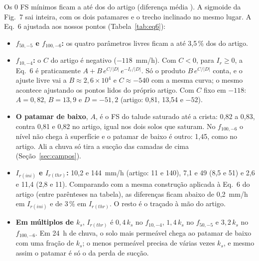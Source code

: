 \documentclass[11pt,a4paper]{article}
\providecommand{\nCasos}{0}\providecommand{\nCampos}{0}\providecommand{\nMalhasF}{0}\providecommand{\iFeitos}{0}
\begin{document}
\begin{table}[H]\centering\small
\caption{A Eq.~6, $F_{s(min)} = A + B/\{1 + \exp[-(I_r - C)/D]\}$ ($I_r$ em mm/h): os parâmetros do artigo (Fig.~7) e os
ajustados aos nossos pontos. $I_{r(ini)}$ e $I_{r(thr)}$: as intensidades em que a tangente ao trecho inclinado da curva
(no gráfico semilog) cruza o patamar de cima e o de baixo; entre parênteses, a mesma construção aplicada à Eq.~6 do
artigo (ele traçou as tangentes à mão). $^\dagger$: $C$ fixo no valor do artigo (com $C < 0$ só $B\,e^{C/|D|}$ é
identificável).}\label{tab:eq6}

\end{table}

Os \nCasos{} FS mínimos ficam a até \difMax{} dos do artigo (diferença média \difMedia). A sigmoide da Fig.~7 sai
inteira, com os dois patamares e o trecho inclinado no mesmo lugar. A Eq.~6 ajustada aos nossos pontos
(Tabela~\ref{tab:eq6}):
\begin{itemize}
  \item \textbf{$f_{50,-5}$ e $f_{100,-6}$:} os quatro parâmetros livres ficam a até 3,5\,\% dos do artigo.
  \item \textbf{$f_{10,-4}$:} o $C$ do artigo é negativo ($-118$~mm/h). Com $C < 0$, para $I_r \ge 0$, a Eq.~6 é
    praticamente $A + B\,e^{C/|D|}\,e^{-I_r/|D|}$. Só o produto $B\,e^{C/|D|}$ conta, e o ajuste livre vai a
    $B \approx 2{,}6\times10^4$ e $C \approx -540$ com a mesma curva; o mesmo acontece ajustando os pontos lidos do
    próprio artigo. Com $C$ fixo em $-118$: $A = 0{,}82$, $B = 13{,}9$ e $D = -51{,}2$ (artigo: 0,81, 13,54 e $-52$).
  \item \textbf{O patamar de baixo}, $A$, é o FS do talude saturado até a crista: 0,82 a 0,83, contra 0,81 e 0,82 no
    artigo, igual nos dois solos que saturam. No $f_{100,-6}$ o nível não chega à superfície e o patamar de baixo é
    outro: 1,45, como no artigo. Ali a chuva só tira a sucção das camadas de cima (Seção~\ref{sec:campos}).
  \item \textbf{$I_{r(ini)}$ e $I_{r(thr)}$:} 10,2 e 144~mm/h (artigo: 11 e 140), 7,1 e 49 (8,5 e 51) e 2,6 e 11,4
    (2,8 e 11). Comparando com a mesma construção aplicada à Eq.~6 do artigo (entre parênteses na tabela), as
    diferenças ficam abaixo de 0,2~mm/h em $I_{r(ini)}$ e de 3\,\% em $I_{r(thr)}$. O resto é o traçado à mão do
    artigo.
  \item \textbf{Em múltiplos de $k_s$}, $I_{r(thr)}$ é $0{,}4\,k_s$ no $f_{10,-4}$, $1{,}4\,k_s$ no $f_{50,-5}$ e
    $3{,}2\,k_s$ no $f_{100,-6}$. Em 24~h de chuva, o solo mais permeável chega ao patamar de baixo com uma fração de
    $k_s$; o menos permeável precisa de várias vezes $k_s$, e mesmo assim o patamar é só o da perda de sucção.
\end{itemize}
\end{document}
